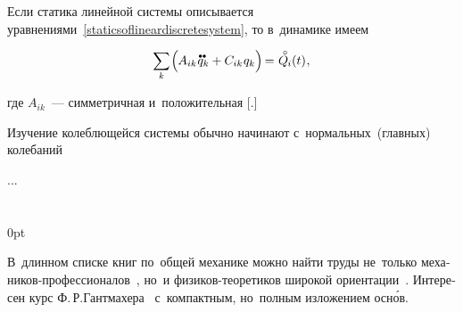 

\label{para:smalloscillations}

\begin{otherlanguage}{russian}

Если статика линейной системы описывается уравнениями~\eqref{staticsoflineardiscretesystem}, то в~динамике имеем

\nopagebreak\vspace{-0.2em}\begin{equation}\label{dynamicsoflineardiscretesystem}
\scalebox{0.95}[1]{$\displaystyle \sum_{\smash{k}}$} \hspace{-0.2ex} \left(^{\mathstrut} \hspace{-0.2ex} A_{ik} \hspace{.12ex} \mathdotdotabove{q}_k + C_{ik} \hspace{.12ex} q_k \right)
\hspace{-0.25ex} = \hspace{.1ex} \mathcircabove{Q}_{\hspace{-0.1ex}i}(t) \hspace{.1ex} ,
\vspace{-0.1em}\end{equation}

\vspace{-0.2em} \noindent где ${A_{ik}}$~--- симметричная и~положительная [.]

Изучение колеблющейся системы обычно начинают с~нормальных~(главных) колебаний

...


\end{otherlanguage}

\section*{\small \wordforbibliography}

\begin{changemargin}{\parindent}{0pt}
\fontsize{10}{12}\selectfont

\begin{otherlanguage}{russian}

В~длинном списке книг по~общей механике можно найти труды не~только механиков\hbox{-}профессионалов~\cite{goldstein-classicalmechanics, loitsjanskiy.lurie, lurie-analyticalmechanics, olkhovskiy-theoreticalmechanicsforphysicists, treatiseonanalyticaldynamics-by-l.a.pars}, но~и физиков\hbox{-}теоретиков широкой ориентации~\cite{landau.lifshitz-shortcourse, terhaar-hamiltonianmechanics}. Интересен курс Ф.\,Р.\;Гантмахера~\cite{gantmacher} с~компактным, но~полным изложением осн\'{о}в.

\end{otherlanguage}

\end{changemargin}
